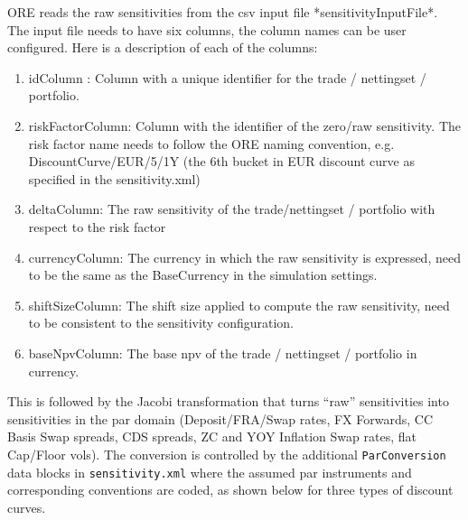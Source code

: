 ORE reads the raw sensitivities from the csv input file *sensitivityInputFile*. The input file needs to have six  columns, the column names can be user configured. Here is a description of each of the columns:

\begin{enumerate}
\item idColumn : Column with a unique identifier for the trade / nettingset / portfolio.
\item riskFactorColumn: Column with the identifier of the zero/raw sensitivity. The risk factor name needs to follow the ORE naming convention, e.g. DiscountCurve/EUR/5/1Y (the 6th bucket in EUR discount curve as specified in the sensitivity.xml)\
\item deltaColumn: The raw sensitivity of the trade/nettingset / portfolio with respect to the risk factor
\item currencyColumn: The currency in which the raw sensitivity is expressed, need to be the same as the BaseCurrency in the simulation settings.
\item shiftSizeColumn: The shift size applied to compute the raw sensitivity, need to be consistent to the sensitivity configuration.
\item baseNpvColumn: The base npv of the trade / nettingset / portfolio in currency.
\end{enumerate}

This is followed by the Jacobi transformation that turns ``raw'' sensitivities  into sensitivities in the par domain (Deposit/FRA/Swap rates, FX Forwards, CC Basis Swap spreads,
CDS spreads, ZC and YOY Inflation Swap rates, flat Cap/Floor vols). The conversion is controlled by the additional {\tt ParConversion} data blocks
in {\tt sensitivity.xml} where the assumed par instruments and corresponding conventions are coded, as shown below for three types of discount curves.

